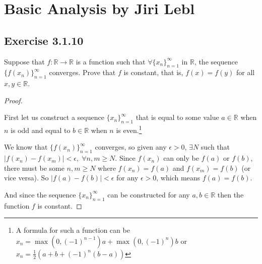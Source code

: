 \documentclass{article}
\begin{document}
\section*{Basic Analysis by Jiri Lebl}
\subsection*{Exercise 3.1.10}
Suppose that $f: \mathbb{R} \rightarrow \mathbb{R}$ is a function such that $\forall \{x_n\}_{n=1}^{\infty}$ in $\mathbb{R}$, the sequence $\{f(x_n)\}_{n=1}^{\infty}$ converges.
Prove that $f$ is constant, that is, $f(x) = f(y)$ for all $x,y \in \mathbb{R}$.
\begin{proof}
\

\noindent
First let us construct a sequence $\{x_n\}_{n=1}^{\infty}$ that is equal to some value $a \in \mathbb{R}$ when $n$ is odd and equal to $b \in \mathbb{R}$ when $n$ is even.\footnote{A formula for such a function can be $x_n = \max(0, (-1)^{n-1})a + \max(0, (-1)^n)b$ or $x_n = \frac{1}{2}(a + b + (-1)^n (b-a))$}

\noindent
We know that $\{f(x_n)\}_{n=1}^{\infty}$ converges, so given any $\epsilon > 0$, $\exists N$ such that $|f(x_n) - f(x_m)| < \epsilon, \; \forall n,m \geq N$.
Since $f(x_n)$ can only be $f(a)$ or $f(b)$, there must be some $n,m \geq N$ where $f(x_n) = f(a)$ and $f(x_m) = f(b)$ (or vice versa).
So $|f(a) - f(b)| < \epsilon$ for any $\epsilon > 0$, which means $f(a) = f(b)$.

\noindent
And since the sequence $\{x_n\}_{n=1}^{\infty}$ can be constructed for any $a,b \in \mathbb{R}$ then the function $f$ is constant.

\end{proof} 
\end{document}
